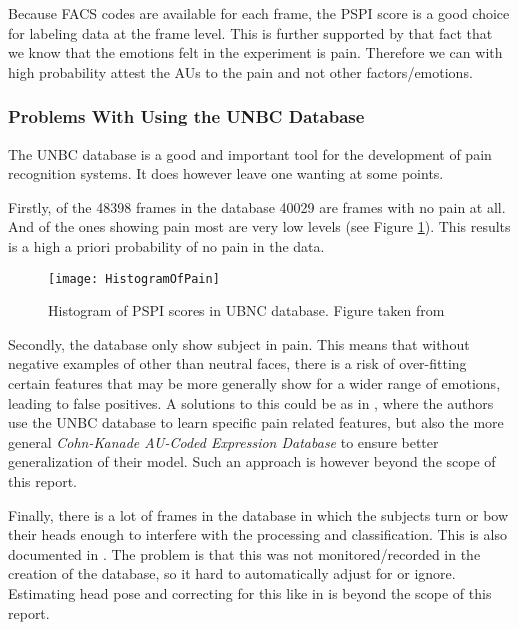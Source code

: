 \documentclass[Main]{subfiles}
\begin{document}
			Because FACS codes are available for each frame, the PSPI score is a good choice for labeling data at the frame level.
			This is further supported by that fact that we know that the emotions felt in the experiment is pain.
			Therefore we can with high probability attest the AUs to the pain and not other factors/emotions.


		\subsubsection{Problems With Using the UNBC Database} %
			\label{ssub:problems_with_using_the_unbc_database}
			The UNBC database is a good and important tool for the development of pain recognition systems.
			It does however leave one wanting at some points.

			Firstly, of the 48398 frames in the database 40029 are frames with no pain at all.
			And of the ones showing pain most are very low levels (see Figure \ref{fig:HistogramOfPain}).
			This results is a high a priori probability of no pain in the data.

			\begin{figure}[H]
				\centering 
				\texttt{[image: HistogramOfPain]}
				\caption{
					Histogram of PSPI scores in UBNC database. 
					Figure taken from \cite{Kaltwang2012}
					}
				\label{fig:HistogramOfPain}
			\end{figure}

			Secondly, the database only show subject in pain.
			This means that without negative examples of other than neutral faces, there is a risk of over-fitting certain features that may be more generally show for a wider range of emotions, leading to false positives.
			A solutions to this could be as in \cite{florealearning}, where the authors use the UNBC database to learn specific pain related features, but also the more general \emph{Cohn-Kanade AU-Coded Expression Database} \cite{Kanade2000} to ensure better generalization of their model.
			Such an approach is however beyond the scope of this report.

			Finally, there is a lot of frames in the database in which the subjects turn or bow their heads enough to interfere with the processing and classification.
			This is also documented in \cite{Lucey2012}.
			The problem is that this was not monitored/recorded in the creation of the database, so it hard to automatically adjust for or ignore.
			Estimating head pose and correcting for this like in \cite{Asthana11posenormalization} is beyond the scope of this report.
\end{document}
